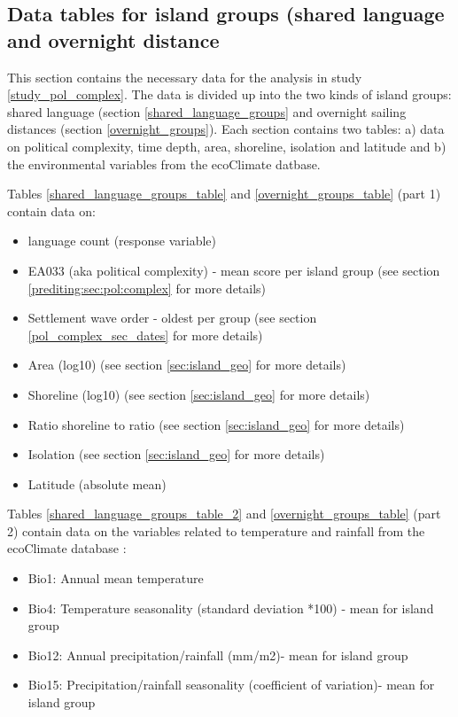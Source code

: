 \documentclass[a4paper,10pt]{article} %
\begin{document}
\subsection{Data tables for island groups (shared language and overnight distance}
\singlespacing
This section contains the necessary data for the analysis in study \ref{study_pol_complex}. The data is divided up into the two kinds of island groups: shared language (section \ref{shared_language_groups} and overnight sailing distances (section \ref{overnight_groups}). Each section contains two tables: a) data on political complexity, time depth, area, shoreline, isolation and latitude and b) the environmental variables from the ecoClimate datbase.

Tables \ref{shared_language_groups_table} and \ref{overnight_groups_table} (part 1) contain data on:

\begin{itemize}
\item language count (response variable)
\item EA033 (aka political complexity) - mean score per island group (see section \ref{prediting:sec:pol:complex} for more details)
\item Settlement wave order - oldest per group (see section \ref{pol_complex_sec_dates} for more details)
\item Area (log10) (see section \ref{sec:island_geo} for more details)
\item Shoreline (log10) (see section \ref{sec:island_geo} for more details)
\item Ratio shoreline to ratio (see section \ref{sec:island_geo} for more details)
\item Isolation (see section \ref{sec:island_geo} for more details)
\item Latitude (absolute mean)
\end{itemize}

Tables \ref{shared_language_groups_table_2} and \ref{overnight_groups_table} (part 2) contain data on the variables related to temperature and rainfall from the ecoClimate database \citep{ecoclimate}:

\begin{itemize}
\item Bio1: Annual mean temperature
\item Bio4: Temperature seasonality (standard deviation *100) - mean for island group
\item Bio12: Annual precipitation/rainfall (mm/m2)- mean for island group
\item Bio15: Precipitation/rainfall seasonality (coefficient of variation)- mean for island group
\end{itemize}
\end{document}
